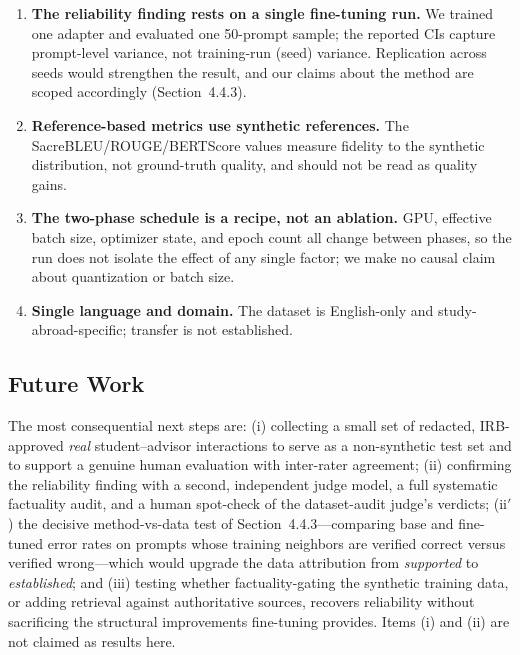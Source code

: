 \documentclass[11pt, a4paper]{article}
\begin{document}
\begin{enumerate}
    \item \textbf{The reliability finding rests on a single fine-tuning run.} We trained one adapter and evaluated one 50-prompt sample; the reported CIs capture prompt-level variance, not training-run (seed) variance. Replication across seeds would strengthen the result, and our claims about the method are scoped accordingly (Section~4.4.3).
    \item \textbf{Reference-based metrics use synthetic references.} The SacreBLEU/ROUGE/BERTScore values measure fidelity to the synthetic distribution, not ground-truth quality, and should not be read as quality gains.
    \item \textbf{The two-phase schedule is a recipe, not an ablation.} GPU, effective batch size, optimizer state, and epoch count all change between phases, so the run does not isolate the effect of any single factor; we make no causal claim about quantization or batch size.
    \item \textbf{Single language and domain.} The dataset is English-only and study-abroad-specific; transfer is not established.
\end{enumerate}

\subsection{Future Work}
The most consequential next steps are: (i) collecting a small set of redacted, IRB-approved \emph{real} student--advisor interactions to serve as a non-synthetic test set and to support a genuine human evaluation with inter-rater agreement; (ii) confirming the reliability finding with a second, independent judge model, a full systematic factuality audit, and a human spot-check of the dataset-audit judge's verdicts; (ii$'$) the decisive method-vs-data test of Section~4.4.3---comparing base and fine-tuned error rates on prompts whose training neighbors are verified correct versus verified wrong---which would upgrade the data attribution from \emph{supported} to \emph{established}; and (iii) testing whether factuality-gating the synthetic training data, or adding retrieval against authoritative sources, recovers reliability without sacrificing the structural improvements fine-tuning provides. Items (i) and (ii) are not claimed as results here.
\end{document}
